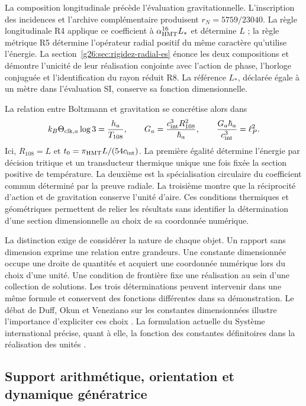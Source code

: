La composition longitudinale précède l'évaluation gravitationnelle.
L'inscription des incidences et l'archive complémentaire produisent
\(r_N=5759/23040\). La règle longitudinale R4 applique ce coefficient
à \(\alpha_{\mathrm{HMT}}^{16}L_*\) et détermine \(L\) ; la règle métrique
R5 détermine l'opérateur radial positif du même caractère qu'utilise
l'énergie. La section~\ref{g26:sec:rigidez-radial-es} énonce les deux
compositions et démontre l'unicité de leur réalisation conjointe avec
l'action de phase, l'horloge conjuguée et l'identification du rayon
réduit R8. La référence \(L_*\), déclarée égale à un mètre dans
l'évaluation SI, conserve sa fonction dimensionnelle.

La relation entre Boltzmann et gravitation se concrétise alors dans
\[
 k_B\Theta_{{\rm clk},a}\log3=\frac{h_a}{T_{108}},\qquad
 G_a=\frac{c_{\rm int}^3R_{108}^2}{\hbar_a},\qquad
 \frac{G_a\hbar_a}{c_{\rm int}^3}=\ell_P^2.
\]
Ici, \(R_{108}=L\) et \(t_0=\pi_{\mathrm{HMT}}L/(54c_{\rm int})\).
La première égalité détermine l'énergie par décision tritique et un
transducteur thermique unique une fois fixée la section positive de
température. La deuxième est la spécialisation circulaire du coefficient
commun déterminé par la preuve radiale. La troisième montre
que la réciprocité d'action et de gravitation conserve l'unité
d'aire. Ces conditions thermiques et géométriques permettent de relier
les résultats sans identifier la détermination d'une section
dimensionnelle au choix de sa coordonnée numérique.

La distinction exige de considérer la nature de chaque objet. Un rapport
sans dimension exprime une relation entre grandeurs. Une constante
dimensionnée occupe une droite de quantités et acquiert une coordonnée numérique
lors du choix d'une unité. Une condition de frontière fixe une réalisation au sein
d'une collection de solutions. Les trois déterminations peuvent intervenir
dans une même formule et conservent des fonctions différentes dans sa démonstration.
Le débat de Duff, Okun et Veneziano sur les constantes dimensionnées
illustre l'importance d'expliciter ces choix
\cite{duffokunveneziano}. La formulation actuelle du Système international
précise, quant à elle, la fonction des constantes définitoires dans la
réalisation des unités \cite{bipm2018,bipmbrochure}.

\subsection{Support arithmétique, orientation et dynamique génératrice}

